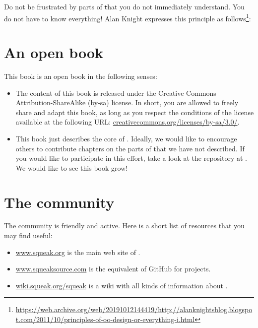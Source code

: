 \documentclass[a4paper,10pt,twoside]{book}
\begin{document}
Do not be frustrated by parts of \st that you do not immediately understand.
You do not have to know everything!
Alan Knight expresses this principle as follows\footnote{\url{https://web.archive.org/web/20191012144419/http://alanknightsblog.blogspot.com/2011/10/principles-of-oo-design-or-everything-i.html}}:

\section*{An open book}

This book is an open book in the following senses:

\begin{itemize}

\item	The content of this book is released under the Creative Commons Attribution-ShareAlike (by-sa) license.
		In short, you are allowed to freely share and adapt this book, as long as you respect the conditions of the license available at the following URL:
		\url{creativecommons.org/licenses/by-sa/3.0/}.

\item	This book just describes the core of \sq.
		Ideally, we would like to encourage others to contribute chapters on the parts of \sq that we have not described.
		If you would like to participate in this effort, take a look at the repository at \sbeRepoUrl.
		We would like to see this book grow!
\end{itemize}

\section*{The \sq community}

The \sq community is friendly and active.
Here is a short list of resources that you may find useful:

\begin{itemize}
\item \url{www.squeak.org} is the main web site of \sq.

\item \url{www.squeaksource.com} is the equivalent of GitHub for \sq projects.

\item \url{wiki.squeak.org/squeak} is a wiki with all kinds of information about \sq.
\end{itemize}
\end{document}
